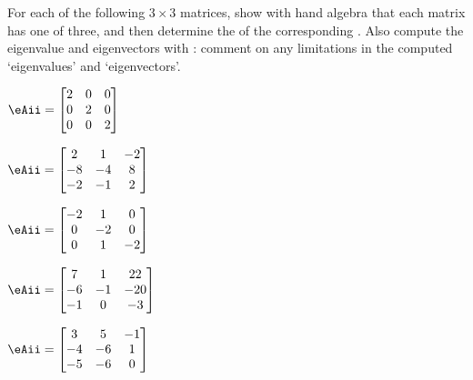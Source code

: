 \begin{exercise}  
For each of the following \(3\times3\) matrices, show with hand algebra that each matrix has one  of  three, and then determine the  of the corresponding .
Also compute the eigenvalue and eigenvectors with \script: comment on any limitations in the computed `eigenvalues' and `eigenvectors'.
\begin{Parts}
\item \(\eAii=\begin{bmatrix} 2 & 0 & 0
\\0 & 2 & 0
\\0 & 0 & 2 \end{bmatrix}\)

\item \(\eAii=\begin{bmatrix} 2 & 1 & -2
\\-8 & -4 & 8
\\-2 & -1 & 2 \end{bmatrix}\)

\item \(\eAii=\begin{bmatrix} -2 & 1 & 0
\\0 & -2 & 0
\\0 & 1 & -2 \end{bmatrix}\)

\item \(\eAii=\begin{bmatrix} 7 & 1 & 22
\\-6 & -1 & -20
\\-1 & 0 & -3 \end{bmatrix}\)

\begin{reduce}
\item \(\eAii=\begin{bmatrix} 3 & 5 & -1
\\-4 & -6 & 1
\\-5 & -6 & 0 \end{bmatrix}\)


\end{reduce}
\end{Parts}
\end{exercise}
